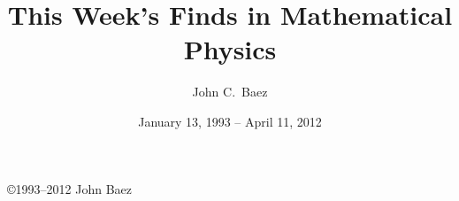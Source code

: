 \documentclass[12pt]{amsart}
\title{This Week's Finds in Mathematical Physics}
\author{John C.\ Baez}
\date{January 13, 1993 -- April 11, 2012}
\begin{document}
\maketitle

\begin{center}\copyright 1993--2012 John Baez\end{center}



\end{document}
